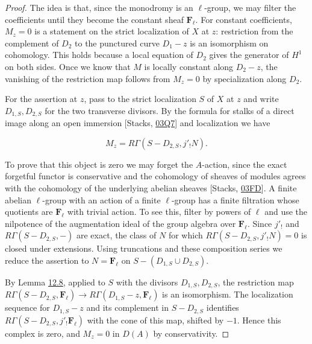 \documentclass[11pt]{article}
\begin{document}
\begin{proof}[{Proof}]\label{bp254}%
The idea is that, since the monodromy is an \(\ell\)-group, we may filter the coefficients until they become the constant sheaf \(\mathbf F_\ell\). For constant coefficients, \(M_z=0\) is a statement on the strict localization of \(X\) at \(z\): restriction from the complement of \(D_2\) to the punctured curve \(D_1-z\) is an isomorphism on cohomology. This holds because a local equation of \(D_2\) gives the generator of \(H^1\) on both sides. Once we know that \(M\) is locally constant along \(D_2-z\), the vanishing of the restriction map follows from \(M_z=0\) by specialization along \(D_2\).

For the assertion at \(z\), pass to the strict localization \(S\) of \(X\) at \(z\) and write \(D_{1,S},D_{2,S}\) for the two transverse divisors. By the formula for stalks of a direct image along an open immersion [Stacks, \href{https://stacks.math.columbia.edu/tag/03Q7}{03Q7}] and localization we have

\[
M_z=R\Gamma(S-D_{2,S},j'_!N).
\]

To prove that this object is zero we may forget the \(A\)-action, since the exact forgetful functor is conservative and the cohomology of sheaves of modules agrees with the cohomology of the underlying abelian sheaves [Stacks, \href{https://stacks.math.columbia.edu/tag/03FD}{03FD}]. A finite abelian \(\ell\)-group with an action of a finite \(\ell\)-group has a finite filtration whose quotients are \(\mathbf F_\ell\) with trivial action. To see this, filter by powers of \(\ell\) and use the nilpotence of the augmentation ideal of the group algebra over \(\mathbf F_\ell\). Since \(j'_!\) and \(R\Gamma(S-D_{2,S},-)\) are exact, the class of \(N\) for which \(R\Gamma(S-D_{2,S},j'_!N)=0\) is closed under extensions. Using truncations and these composition series we reduce the assertion to \(N=\mathbf F_\ell\) on \(S-(D_{1,S}\cup D_{2,S})\).

By Lemma \hyperref[bp251]{12.8}, applied to \(S\) with the divisors \(D_{1,S},D_{2,S}\), the restriction map \(R\Gamma(S-D_{2,S},\mathbf F_\ell)\to R\Gamma(D_{1,S}-z,\mathbf F_\ell)\) is an isomorphism. The localization sequence for \(D_{1,S}-z\) and its complement in \(S-D_{2,S}\) identifies \(R\Gamma(S-D_{2,S},j'_!\mathbf F_\ell)\) with the cone of this map, shifted by \(-1\). Hence this complex is zero, and \(M_z=0\) in \(D(A)\) by conservativity.


\end{proof}
\end{document}
